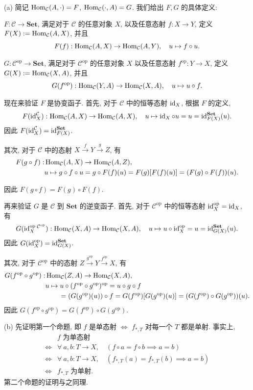 \documentclass{article}
\newcommand{\op}{^{\mathrm{op}}}
\begin{document}
\begin{solution}
	(a) 简记 $\operatorname{Hom}_{\mathcal{C}}(A,\cdot) = F$, $\operatorname{Hom}_{\mathcal{C}}(\cdot,A) = G$. 我们给出 $F, G$ 的具体定义: 

	$F: \mathcal{C} \to \mathbf{Set}$, 满足对于 $\mathcal{C}$ 的任意对象 $X$, 以及任意态射 $f: X\to Y$, 定义 $F(X) := \operatorname{Hom}_{\mathcal{C}}(A,X)$, 并且
	\[ F(f): \operatorname{Hom}_{\mathcal C}(A,X) \to \operatorname{Hom}_{\mathcal C}(A,Y),\quad u\mapsto f\circ u. \]

	$G: \mathcal{C}\op \to \mathbf{Set}$, 满足对于 $\mathcal{C}\op$ 的任意对象 $X$ 以及任意态射 $f\op: Y\to X$, 定义 $G(X) := \operatorname{Hom}_{\mathcal{C}}(X,A)$, 并且
	\[ G(f\op): \Hom_{\mathcal{C}}(Y,A) \to \Hom_{\mathcal{C}}(X,A), \quad u \mapsto u \circ f. \]

	现在来验证 $F$ 是协变函子. 首先, 对于 $\mathcal{C}$ 中的恒等态射 $\operatorname{id}_X$, 根据 $F$ 的定义, 
	\[ F(\operatorname{id}_X^{\mathcal{C}}): \operatorname{Hom}_{\mathcal{C}}(A,X) \to \operatorname{Hom}_{\mathcal{C}}(A,X), \quad u \mapsto \operatorname{id}_X \circ u = u = \operatorname{id}_{F(X)}^{\mathbf{Set}}(u). \]
	因此 $F(\operatorname{id}_X^{\mathcal{C}}) = \operatorname{id}_{F(X)}^{\mathbf{Set}}$.

	其次, 对于 $\mathcal{C}$ 中的态射 $X \xrightarrow{f} Y \xrightarrow{g} Z$, 有
	\begin{align*}
		F(g\circ f): 
		&\operatorname{Hom}_{\mathcal{C}}(A,X) \to \operatorname{Hom}_{\mathcal{C}}(A,Z), \\
		&u \mapsto g \circ f \circ u = g \circ F(f)(u) = F(g)[F(f)(u)] = (F(g) \circ F(f))(u). 
	\end{align*}

	因此 $F(g\circ f) = F(g) \circ F(f)$.

	再来验证 $G$ 是 $\mathcal{C}$ 到 $\mathbf{Set}$ 的逆变函子. 首先, 对于 $\mathcal{C}\op$ 中的恒等态射 $\id_X\op = \id_X$, 有
	\[ G(\id_X\op{}^{\mathcal{C}\op}): \Hom_{\mathcal{C}}(X,A) \to \Hom_{\mathcal{C}}(X,A), \quad u \mapsto u \circ \id_X\op = u = \id_{G(X)}^{\mathbf{Set}}(u). \]
	因此 $G(\id_X\op) = \id_{G(X)}^{\mathbf{Set}}$.

	其次, 对于 $\mathcal{C}\op$ 中的态射 $Z \xrightarrow{g\op} Y \xrightarrow{f\op} X$, 有
	\begin{align*}
		G(f\op \circ g\op): 
		&\Hom_{\mathcal{C}}(Z,A) \to \Hom_{\mathcal{C}}(X,A), \\
		&u \mapsto u \circ (f\op \circ g\op)\op = u \circ g \circ f \\
		&\qquad =(G(g\op)(u)) \circ f = G(f\op)[G(g\op)(u)] =(G(f\op) \circ G(g\op))(u).
	\end{align*}
	因此 $G(f\op \circ g\op) = G(f\op) \circ G(g\op)$.

	(b) 先证明第一个命题, 即 $f$ 是单态射 $\Leftrightarrow$ $f_{*,T}$ 对每一个 $T$ 都是单射. 事实上,
	\[ \begin{array}{cc}
		 & f \text{ 为单态射} \\
		\Leftrightarrow & \forall\ a,b: T \to X, \quad (f \circ a = f \circ b \implies a = b) \\
		\Leftrightarrow & \forall\ a,b: T \to X, \quad (f_{*,T}(a) = f_{*,T}(b) \implies a = b) \\
		\Leftrightarrow & f_{*,T} \text{ 为单射}.
	\end{array} \]
	第二个命题的证明与之同理.
\end{solution}
\end{document}
